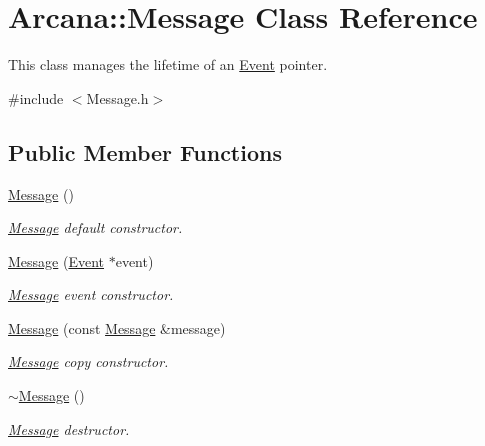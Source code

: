 \hypertarget{class_arcana_1_1_message}{}\section{Arcana\+:\+:Message Class Reference}
\label{class_arcana_1_1_message}


This class manages the lifetime of an \mbox{\hyperlink{class_arcana_1_1_event}{Event}} pointer.  




{\ttfamily \#include $<$Message.\+h$>$}

\subsection*{Public Member Functions}
\begin{DoxyCompactItemize}
\item 
\mbox{\label{class_arcana_1_1_message_ab3cbb035a75bbca7335238fc904cf685}} 
\mbox{\hyperlink{class_arcana_1_1_message_ab3cbb035a75bbca7335238fc904cf685}{Message}} ()
\begin{DoxyCompactList}\small\item\em \mbox{\hyperlink{class_arcana_1_1_message}{Message}} default constructor. \end{DoxyCompactList}\item 
\mbox{\hyperlink{class_arcana_1_1_message_aca77fd2984b45c908631451d1ab29fa1}{Message}} (\mbox{\hyperlink{class_arcana_1_1_event}{Event}} $\ast$event)
\begin{DoxyCompactList}\small\item\em \mbox{\hyperlink{class_arcana_1_1_message}{Message}} event constructor. \end{DoxyCompactList}\item 
\mbox{\hyperlink{class_arcana_1_1_message_a4c1cb77c70947ff48b6f54f83b94e141}{Message}} (const \mbox{\hyperlink{class_arcana_1_1_message}{Message}} \&message)
\begin{DoxyCompactList}\small\item\em \mbox{\hyperlink{class_arcana_1_1_message}{Message}} copy constructor. \end{DoxyCompactList}\item 
\mbox{\hyperlink{class_arcana_1_1_message_a08fee1d23b404de28250cc3e61bdef6b}{$\sim$\+Message}} ()
\begin{DoxyCompactList}\small\item\em \mbox{\hyperlink{class_arcana_1_1_message}{Message}} destructor. \end{DoxyCompactList}\item 

\end{DoxyCompactItemize}
